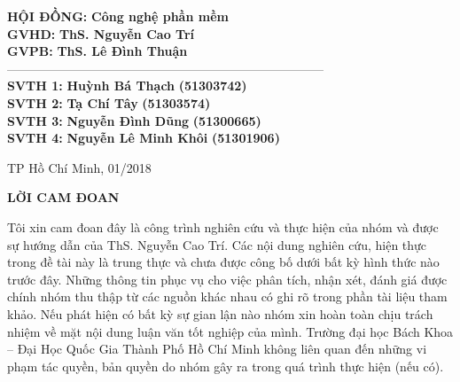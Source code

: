 \documentclass[a4paper,12pt,oneside]{article}
\begin{document}
{\fontsize{13pt}{1}
\begin{tabbing}

\hspace*{5cm} \= \textbf{HỘI ĐỒNG:} \hspace*{0.01cm} \= \textbf{Công nghệ phần mềm} \\
\> \textbf{GVHD:} \> \textbf{ThS. Nguyễn Cao Trí}\\
\> \textbf{GVPB:} \> \textbf{ThS. Lê Đình Thuận}\\
\> -----------------------------------------------------------------------------\\
\> \textbf{SVTH 1:} \> \textbf{Huỳnh Bá Thạch} \hspace*{1cm} \= \textbf{(51303742)}\\
\> \textbf{SVTH 2:} \> \textbf{Tạ Chí Tây} \> \textbf{(51303574)}\\
\> \textbf{SVTH 3:} \> \textbf{Nguyễn Đình Dũng} \> \textbf{(51300665)}\\
\> \textbf{SVTH 4:} \> \textbf{Nguyễn Lê Minh Khôi} \> \textbf{(51301906)}\\
\end{tabbing}
}

\vspace{\fill}
\begin{center}
{\fontsize{20pt}{1} TP Hồ Chí Minh, 01/2018}\\
\end{center}
\ClearShipoutPicture

\newpage

\begin{center}
{\fontsize{20pt}{1}\selectfont \textbf{LỜI CAM ĐOAN}}\\[1cm]
\end{center}
Tôi xin cam đoan đây là công trình nghiên cứu và thực hiện của nhóm và được sự
hướng dẫn của ThS. Nguyễn Cao Trí. Các nội dung nghiên cứu, hiện thực trong đề tài
này là trung thực và chưa được công bố dưới bất kỳ hình thức nào trước đây. Những
thông tin phục vụ cho việc phân tích, nhận xét, đánh giá được chính
nhóm thu thập từ các nguồn khác nhau có ghi rõ trong phần tài liệu tham khảo.
Nếu phát hiện có bất kỳ sự gian lận nào nhóm xin hoàn toàn chịu trách nhiệm
về mặt nội dung luận văn tốt nghiệp của mình. Trường đại học Bách Khoa – Đại Học
Quốc Gia Thành Phố Hồ Chí Minh không liên quan đến những vi phạm tác quyền,
bản quyền do nhóm gây ra trong quá trình thực hiện (nếu có).
\end{document}
